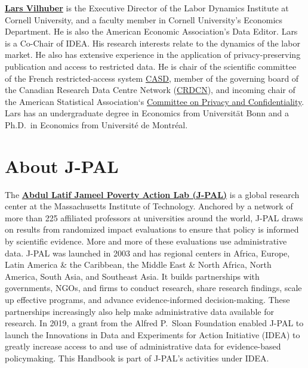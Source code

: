 \textbf{\href{https://lars.vilhuber.com/}{Lars Vilhuber}} is the Executive Director of the Labor Dynamics Institute at Cornell University, and a faculty member in Cornell University's Economics Department. He is also the American Economic Association's Data Editor. Lars is a Co-Chair of IDEA. His research interests relate to the dynamics of the labor market. He also has extensive experience in the application of privacy-preserving publication and access to restricted data. He is chair of the scientific committee of the French restricted-access system \href{https://casd.eu}{CASD}, member of the governing board of the Canadian Research Data Centre Network (\href{https://crdcn.org}{CRDCN}), and incoming chair of the American Statistical Association`s \href{https://community.amstat.org/cpc/home}{Committee on Privacy and Confidentiality}. Lars has an undergraduate degree in Economics from Universität Bonn and a Ph.D.~in Economics from Université de Montréal.

\newpage
\hypertarget{about2}{%
\section*{About J-PAL}\label{about2}}
The \textbf{\href{https://www.povertyactionlab.org/}{Abdul Latif Jameel Poverty Action Lab (J-PAL)}} is a global research center at the Massachusetts Institute of Technology. Anchored by a network of more than 225 affiliated professors at universities around the world, J-PAL draws on results from randomized impact evaluations to ensure that policy is informed by scientific evidence. More and more of these evaluations use administrative data. J-PAL was launched in 2003 and has regional centers in Africa, Europe, Latin America \& the Caribbean, the Middle East \& North Africa, North America, South Asia, and Southeast Asia. It builds partnerships with governments, NGOs, and firms to conduct research, share research findings, scale up effective programs, and advance evidence-informed decision-making. These partnerships increasingly also help make administrative data available for research. In 2019, a grant from the Alfred P.\ Sloan Foundation enabled J-PAL to launch the Innovations in Data and Experiments for Action Initiative (IDEA) to greatly increase access to and use of administrative data for evidence-based policymaking. This Handbook is part of J-PAL's activities under IDEA.

